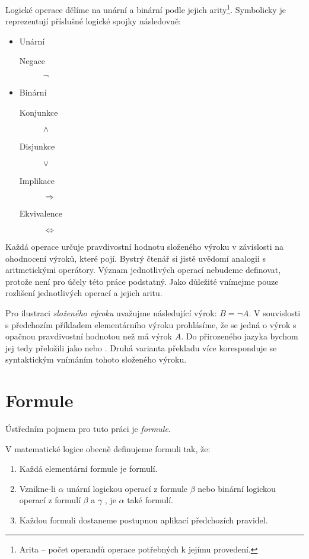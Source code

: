\documentclass[thesis=B,czech,hidelinks]{FITthesis}[2012/06/26]
\begin{document}
Logické operace dělíme na unární a binární podle jejich arity\footnote{Arita -- počet operandů operace potřebných k jejímu provedení.}. Symbolicky je reprezentují příslušné logické spojky následovně:

\begin{itemize}
	\item Unární
	\begin{description}
		\item[Negace] $\neg$
	\end{description}
	\item Binární
	\begin{description}
		\item[Konjunkce] $\wedge$
		\item[Disjunkce] $\vee$
		\item[Implikace] $\Rightarrow$
		\item[Ekvivalence] $\Leftrightarrow$
	\end{description}
\end{itemize}

Každá operace určuje pravdivostní hodnotu složeného výroku v závislosti na ohodnocení výroků, které pojí. Bystrý čtenář si jistě uvědomí analogii s aritmetickými operátory. Význam jednotlivých operací nebudeme definovat, protože není pro účely této práce podstatný. Jako důležité vnímejme pouze rozlišení jednotlivých operací a jejich aritu.

\begin{ex}
Pro ilustraci \emph{složeného výroku} uvažujme následující výrok: $B = \neg A$. V souvislosti s předchozím příkladem elementárního výroku prohlásíme, že se jedná o výrok s opačnou pravdivostní hodnotou než má výrok $A$. Do přirozeného jazyka bychom jej tedy přeložili jako  nebo . Druhá varianta překladu více koresponduje se syntaktickým vnímáním tohoto složeného výroku.
\end{ex}

\section{Formule}

Ústředním pojmem pro tuto práci je \emph{formule}.

\begin{df}
V matematické logice obecně definujeme formuli tak, že:

\begin{enumerate}
	\item Každá elementární formule je formulí.
	\item Vznikne-li $\alpha$ unární logickou operací z formule $\beta$ nebo binární logickou operací z formulí $\beta$ a $\gamma$ , je $\alpha$ také formulí.
	\item Každou formuli dostaneme postupnou aplikací předchozích pravidel\cite{sochor}.
\end{enumerate}
\end{df}
\end{document}
